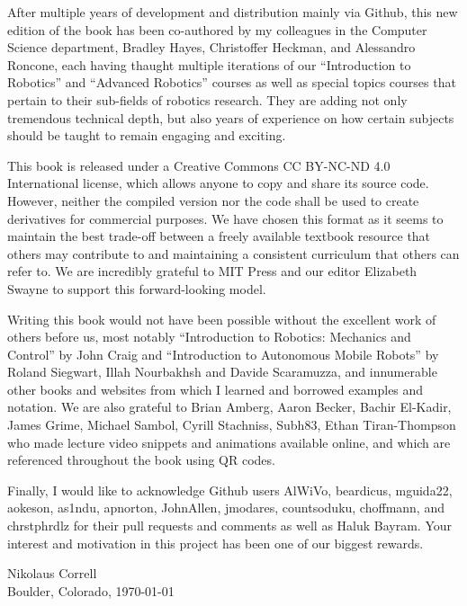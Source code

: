 \documentclass[paper=7in:9in,pagesize=pdftex,11pt,twoside,openright]{scrbook}
\begin{document}
After multiple years of development and distribution mainly via Github, this new edition of the book has been co-authored by my colleagues in the Computer Science department, Bradley Hayes, Christoffer Heckman, and Alessandro Roncone, each having thaught multiple iterations of our ``Introduction to Robotics'' and ``Advanced Robotics'' courses as well as special topics courses that pertain to their sub-fields of robotics research. They are adding not only tremendous technical depth, but also years of experience on how certain subjects should be taught to remain engaging and exciting.

This book is released under a Creative Commons CC BY-NC-ND 4.0 International license, which allows anyone to copy and share its source code. However, neither the compiled version nor the code shall be used to create derivatives for commercial purposes. We have chosen this format as it seems to maintain the best trade-off between a freely available textbook resource that others may contribute to and maintaining a consistent curriculum that others can refer to. We are incredibly grateful to MIT Press and our editor Elizabeth Swayne to support this forward-looking model.

Writing this book would not have been possible without the excellent work of others before us, most notably ``Introduction to Robotics: Mechanics and Control'' by John Craig and ``Introduction to Autonomous Mobile Robots'' by Roland Siegwart, Illah Nourbakhsh and Davide Scaramuzza, and innumerable other books and websites from which I learned and borrowed examples and notation. We are also grateful to Brian Amberg, Aaron Becker, Bachir El-Kadir,  James Grime, Michael Sambol, Cyrill Stachniss, Subh83, Ethan Tiran-Thompson who made lecture video snippets and animations available online, and which are referenced throughout the book using QR codes.

Finally, I would like to acknowledge Github users AlWiVo, beardicus, mguida22, aokeson, as1ndu, apnorton, JohnAllen, jmodares, countsoduku, choffmann, and chrstphrdlz for their pull requests and comments as well as Haluk Bayram. Your interest and motivation in this project has been one of our biggest rewards.

\begin{flushright}
Nikolaus Correll\\
Boulder, Colorado, \today
\end{flushright}


\end{document}
